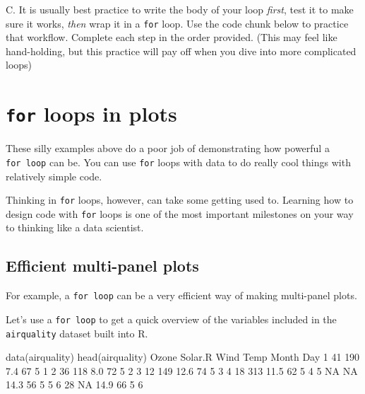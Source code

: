 \documentclass[
]{book}
\newenvironment{Shaded}{\begin{snugshade}}{\end{snugshade}}
\newcommand{\ConstantTok}[1]{\textcolor[rgb]{0.00,0.00,0.00}{#1}}
\newcommand{\DecValTok}[1]{\textcolor[rgb]{0.00,0.00,0.81}{#1}}
\newcommand{\FloatTok}[1]{\textcolor[rgb]{0.00,0.00,0.81}{#1}}
\newcommand{\FunctionTok}[1]{\textcolor[rgb]{0.00,0.00,0.00}{#1}}
\newcommand{\NormalTok}[1]{#1}
\begin{document}
C. It is usually best practice to write the body of your loop \emph{first}, test it to make sure it works, \emph{then} wrap it in a \texttt{for} loop. Use the code chunk below to practice that workflow. Complete each step in the order provided. (This may feel like hand-holding, but this practice will pay off when you dive into more complicated loops)

\hypertarget{for-loops-in-plots}{%
\section*{\texorpdfstring{\texttt{for} loops in plots}{for loops in plots}}\label{for-loops-in-plots}}

These silly examples above do a poor job of demonstrating how powerful a \texttt{for\ loop} can be. You can use \texttt{for} loops with data to do really cool things with relatively simple code.

Thinking in \texttt{for} loops, however, can take some getting used to. Learning how to design code with \texttt{for} loops is one of the most important milestones on your way to thinking like a data scientist.

\hypertarget{efficient-multi-panel-plots}{%
\subsection*{Efficient multi-panel plots}\label{efficient-multi-panel-plots}}

For example, a \texttt{for\ loop} can be a very efficient way of making multi-panel plots.

Let's use a \texttt{for\ loop} to get a quick overview of the variables included in the \texttt{airquality} dataset built into R.

\begin{Shaded}
\begin{Highlighting}[]
\FunctionTok{data}\NormalTok{(airquality)}
\FunctionTok{head}\NormalTok{(airquality)}
\NormalTok{  Ozone Solar.R Wind Temp Month Day}
\DecValTok{1}    \DecValTok{41}     \DecValTok{190}  \FloatTok{7.4}   \DecValTok{67}     \DecValTok{5}   \DecValTok{1}
\DecValTok{2}    \DecValTok{36}     \DecValTok{118}  \FloatTok{8.0}   \DecValTok{72}     \DecValTok{5}   \DecValTok{2}
\DecValTok{3}    \DecValTok{12}     \DecValTok{149} \FloatTok{12.6}   \DecValTok{74}     \DecValTok{5}   \DecValTok{3}
\DecValTok{4}    \DecValTok{18}     \DecValTok{313} \FloatTok{11.5}   \DecValTok{62}     \DecValTok{5}   \DecValTok{4}
\DecValTok{5}    \ConstantTok{NA}      \ConstantTok{NA} \FloatTok{14.3}   \DecValTok{56}     \DecValTok{5}   \DecValTok{5}
\DecValTok{6}    \DecValTok{28}      \ConstantTok{NA} \FloatTok{14.9}   \DecValTok{66}     \DecValTok{5}   \DecValTok{6}
\end{Highlighting}
\end{Shaded}
\end{document}
